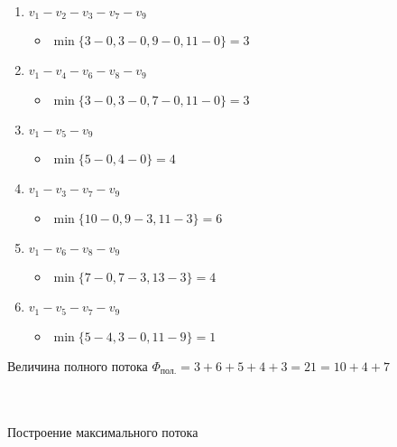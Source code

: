 \documentclass{article}
\begin{document}
\begin{enumerate} 
	\setlength{\itemindent}{3mm}
	\item $v_1 - v_2 - v_3 - v_7 - v_9$
	\begin{itemize}
		\setlength{\itemindent}{3mm}
		\item $\min\{3-0, 3-0, 9-0, 11-0\} = 3$
	\end{itemize}
	\item $v_1 - v_4 - v_6 - v_8 - v_9$
	\begin{itemize}
		\setlength{\itemindent}{3mm}
		\item $\min\{3-0, 3-0, 7-0, 11-0\} = 3$
	\end{itemize}
	\item $v_1 - v_5 - v_9$
	\begin{itemize}
		\setlength{\itemindent}{3mm}
		\item $\min\{5-0, 4-0\} = 4$
	\end{itemize}
	\item $v_1 - v_3 - v_7 - v_9$
	\begin{itemize}
		\setlength{\itemindent}{3mm}
		\item $\min\{10-0, 9-3, 11-3\} = 6$
	\end{itemize}
\newpage
	\item $v_1 - v_6 - v_8 - v_9$
	\begin{itemize}
		\setlength{\itemindent}{3mm}
		\item $\min\{7-0, 7-3, 13-3\} = 4$
	\end{itemize}
	\item $v_1 - v_5 - v_7 - v_9$
	\begin{itemize}
		\setlength{\itemindent}{3mm}
		\item $\min\{5-4, 3-0, 11-9\} = 1$
	\end{itemize}
\end{enumerate}
\par
Величина полного потока $\Phi_{\text{пол.}} = 3 + 6 + 5 + 4 + 3 = 21 = 10 + 4 + 7$\\\\\
\par
Построение максимального потока\\\\
\vspace{5mm}
\end{document}
